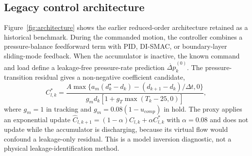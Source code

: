 \documentclass[machines,article,submit,pdftex,moreauthors]{Definitions/mdpi}
\begin{document}
\begin{table}[H]
\centering
\caption{Selected V2 virtual-prototype inputs and one-at-a-time stress settings. Full provenance and all nominal values are in \texttt{paper1\_v2\_parameter\_manifest.csv}; none is an identified physical measurement.}
\label{tab:assumptions}
\end{table}

\subsection{Legacy control architecture}
Figure~\ref{fig:architecture} shows the earlier reduced-order architecture retained as a historical benchmark. During the commanded motion, the controller combines a pressure-balance feedforward term with PID, DI-SMAC, or boundary-layer sliding-mode feedback. When the accumulator is inactive, the known command and load define a leakage-free pressure-rate prediction $\dot{\Delta p}^{(0)}_k$. The pressure-transition residual gives a non-negative coefficient candidate,
\begin{equation}
 C^*_{l,k}=\frac{A\max\{a_m(d_k^\star-d_k)-(d_{k+1}-d_k)/\Delta t,0\}}{g_m d_k[1+g_T\max(T_k-25,0)]},
\end{equation}
where $g_m=1$ in tracking and $g_m=0.08(1-u_{comp})$ in hold. The proxy applies an exponential update $\hat C_{l,k+1}=(1-\alpha)\hat C_{l,k}+\alpha C^*_{l,k}$ with $\alpha=0.08$ and does not update while the accumulator is discharging, because its virtual flow would confound a leakage-only residual. This is a model inversion diagnostic, not a physical leakage-identification method.
\end{document}
